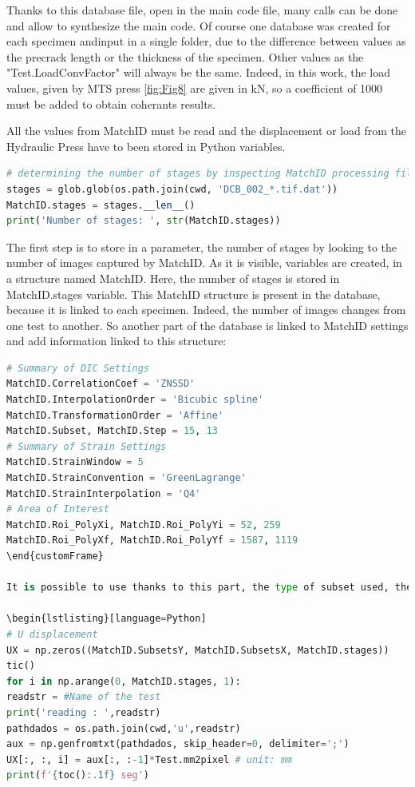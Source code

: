 

Thanks to this database file, open in the main code file, many calls can be done and allow to synthesize the main code. Of course one database was created for each specimen andinput in a single folder, due to the difference between values as the precrack length or the thickness of the specimen. Other values as the "Test.LoadConvFactor" will always be the same. Indeed, in this work, the load values, given by MTS press \ref{fig:Fig8} are given in \si{\kilo\newton}, so a coefficient of 1000 must be added to obtain coherants results.

All the values from MatchID must be read and the displacement or load from the Hydraulic Press have to been stored in Python variables. 

\begin{lstlisting}[language=Python]
# determining the number of stages by inspecting MatchID processing files
stages = glob.glob(os.path.join(cwd, 'DCB_002_*.tif.dat'))
MatchID.stages = stages.__len__()
print('Number of stages: ', str(MatchID.stages))
\end{lstlisting}

The first step is to store in a parameter, the number of stages by looking to the number of images captured by MatchID. As it is visible, variables are created, in a structure named MatchID. Here, the number of stages is stored in MatchID.stages variable. This MatchID structure is present in the database, because it is linked to each specimen. Indeed, the number of images changes from one test to another. So another part of the database is linked to MatchID settings and add information linked to this structure:  

\begin{lstlisting}[language=Python]
	# Summary of DIC Settings
MatchID.CorrelationCoef = 'ZNSSD'
MatchID.InterpolationOrder = 'Bicubic spline'
MatchID.TransformationOrder = 'Affine'
MatchID.Subset, MatchID.Step = 15, 13
# Summary of Strain Settings
MatchID.StrainWindow = 5
MatchID.StrainConvention = 'GreenLagrange'
MatchID.StrainInterpolation = 'Q4'
# Area of Interest
MatchID.Roi_PolyXi, MatchID.Roi_PolyYi = 52, 259
MatchID.Roi_PolyXf, MatchID.Roi_PolyYf = 1587, 1119
\end{customFrame}

It is possible to use thanks to this part, the type of subset used, the steps, the strain window and intrpolation, previously chosen looking on the best parameters on MatchID curves. Then, the displacements and load of every stages must be stored to. In order to do it, an iterative loop is created :

\begin{lstlisting}[language=Python]
# U displacement
UX = np.zeros((MatchID.SubsetsY, MatchID.SubsetsX, MatchID.stages))
tic()
for i in np.arange(0, MatchID.stages, 1):
readstr = #Name of the test
print('reading : ',readstr)
pathdados = os.path.join(cwd,'u',readstr)
aux = np.genfromtxt(pathdados, skip_header=0, delimiter=';')
UX[:, :, i] = aux[:, :-1]*Test.mm2pixel # unit: mm
print(f'{toc():.1f} seg')
\end{lstlisting}

